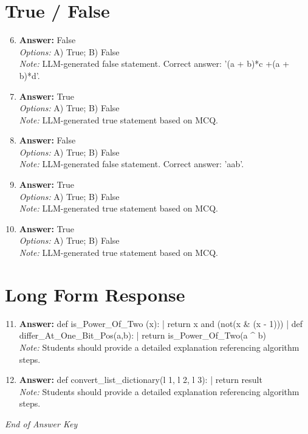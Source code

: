 \documentclass[12pt]{article}
\begin{document}
\section*{True / False}
\begin{enumerate}[label=\arabic*.]
\setcounter{enumi}{5}
\item \textbf{Answer:} False
\\ \textit{Options:} A) True; B) False
\\ \textit{Note:} LLM-generated false statement. Correct answer: '(a + b)*c +(a + b)*d'.
\item \textbf{Answer:} True
\\ \textit{Options:} A) True; B) False
\\ \textit{Note:} LLM-generated true statement based on MCQ.
\item \textbf{Answer:} False
\\ \textit{Options:} A) True; B) False
\\ \textit{Note:} LLM-generated false statement. Correct answer: 'aab'.
\item \textbf{Answer:} True
\\ \textit{Options:} A) True; B) False
\\ \textit{Note:} LLM-generated true statement based on MCQ.
\item \textbf{Answer:} True
\\ \textit{Options:} A) True; B) False
\\ \textit{Note:} LLM-generated true statement based on MCQ.
\end{enumerate}

\section*{Long Form Response}
\begin{enumerate}[label=\arabic*.]
\setcounter{enumi}{10}
\item \textbf{Answer:} def is\_Power\_Of\_Two (x): | return x and (not(x \& (x - 1))) | def differ\_At\_One\_Bit\_Pos(a,b): | return is\_Power\_Of\_Two(a ^ b)
\\ \textit{Note:} Students should provide a detailed explanation referencing algorithm steps.
\item \textbf{Answer:} def convert\_list\_dictionary(l 1, l 2, l 3): | return result
\\ \textit{Note:} Students should provide a detailed explanation referencing algorithm steps.
\end{enumerate}

\vfill
\noindent\textit{End of Answer Key}
\end{document}
